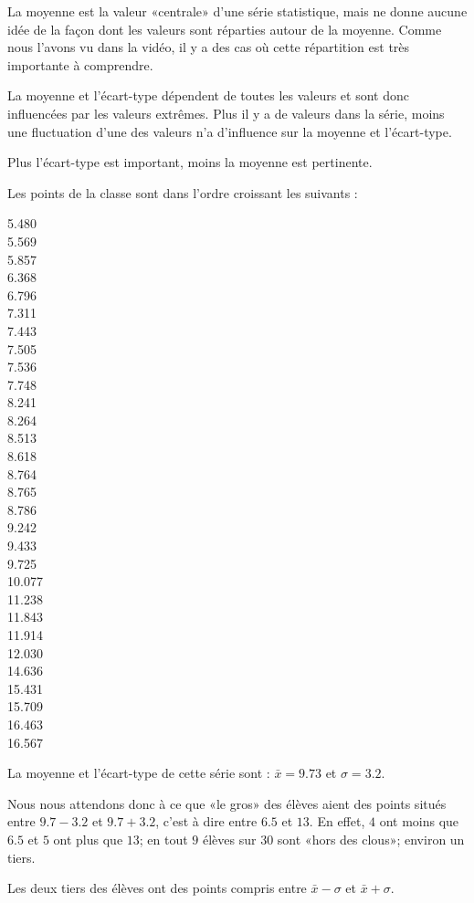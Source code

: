 La moyenne est la valeur «centrale» d'une série statistique, mais ne donne aucune idée de la façon dont les valeurs sont réparties autour de la moyenne. Comme nous l'avons vu dans la vidéo, il y a des cas où cette répartition est très importante à comprendre.

La moyenne et l'écart-type dépendent de toutes les valeurs et sont donc influencées par les valeurs extrêmes. Plus il y a de valeurs dans la série, moins une fluctuation d'une des valeurs n'a d'influence sur la moyenne et l'écart-type.

\begin{Aretenir}
    Plus l'écart-type est important, moins la moyenne est pertinente.
\end{Aretenir}

\begin{example}
    Les points de la classe sont dans l'ordre croissant les suivants :

    \begin{center}
    \begin{multicols}{3}
5.480\\
5.569\\
5.857\\
6.368\\
6.796\\
7.311\\
7.443\\
7.505\\
7.536\\
7.748\\
8.241\\
8.264\\
8.513\\
8.618\\
8.764\\
8.765\\
8.786\\
9.242\\
9.433\\
9.725\\
10.077\\
11.238\\
11.843\\
11.914\\
12.030\\
14.636\\
15.431\\
15.709\\
16.463\\
16.567
    \end{multicols}
    \end{center}
    La moyenne et l'écart-type de cette série sont : $\bar x=9.73$ et \( \sigma=3.2\).

    Nous nous attendons donc à ce que «le gros» des élèves aient des points situés entre \( 9.7-3.2\) et \( 9.7+3.2\), c'est à dire entre \( 6.5\) et \( 13\). En effet, \( 4\) ont moins que \( 6.5\) et \( 5\) ont plus que \( 13\); en tout \( 9\) élèves sur \( 30\) sont «hors des clous»; environ un tiers.

    Les deux tiers des élèves ont des points compris entre \( \bar x-\sigma\) et \( \bar x+\sigma\).
\end{example}

